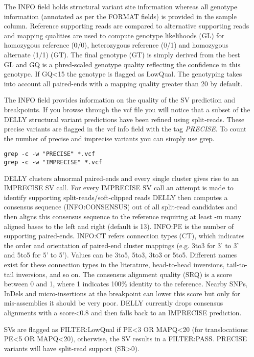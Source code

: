 \begin{note}

The INFO field holds structural variant site information whereas all genotype information (annotated as per the FORMAT fields) is provided in the sample column. Reference supporting reads are compared to alternative supporting reads and mapping qualities are used to compute genotype likelihoods (GL) for homozygous reference (0/0), heterozygous reference (0/1) and homozygous alternate (1/1) (GT). The final genotype (GT) is simply derived from the best GL and GQ is a phred-scaled genotype quality reflecting the confidence in this genotype. If GQ\textless15 the genotype is flagged as LowQual. The genotyping takes into account all paired-ends with a mapping quality greater than 20 by default. 

The INFO field provides information on the quality of the SV prediction and breakpoints. If you browse through the vcf file you will notice that a subset of the DELLY structural variant predictions have been refined using split-reads. These precise variants are flagged in the vcf info field with the tag \emph{PRECISE}. To count the number of precise and imprecise variants you can simply use grep.

\end{note}

\begin{steps}
\begin{lstlisting}
grep -c -w "PRECISE" *.vcf
grep -c -w "IMPRECISE" *.vcf
\end{lstlisting}
\end{steps}


\begin{information}
DELLY clusters abnormal paired-ends and every single cluster gives rise to an IMPRECISE SV call. For every IMPRECISE SV call an attempt is made to identify supporting split-reads/soft-clipped reads DELLY then computes a consensus sequence (INFO:CONSENSUS) out of all split-read candidates and then aligns this consensus sequence to the reference requiring at least -m many aligned bases to the left and right (default is 13). INFO:PE is the number of supporting paired-ends. INFO:CT refers connection types (CT), which indicates the order and orientation of paired-end cluster mappings (e.g. 3to3 for 3' to 3' and 5to5 for 5' to 5'). Values can be 3to5, 5to3, 3to3 or 5to5. Different names exist for these connection types in the literature, head-to-head inversions, tail-to-tail inversions, and so on. The consensus alignment quality (SRQ) is a score between 0 and 1, where 1 indicates 100\% identity to the reference. Nearby SNPs, InDels and micro-insertions at the breakpoint can lower this score but only for mis-assemblies it should be very poor. DELLY currently drops consensus alignments with a score\textless0.8 and then falls back to an IMPRECISE prediction. 

SVs are flagged as FILTER:LowQual if PE\textless3 OR MAPQ\textless20 (for translocations: PE\textless5 OR MAPQ\textless20), otherwise, the SV results in a FILTER:PASS. PRECISE variants will have split-read support (SR\textgreater0).

\end{information}

